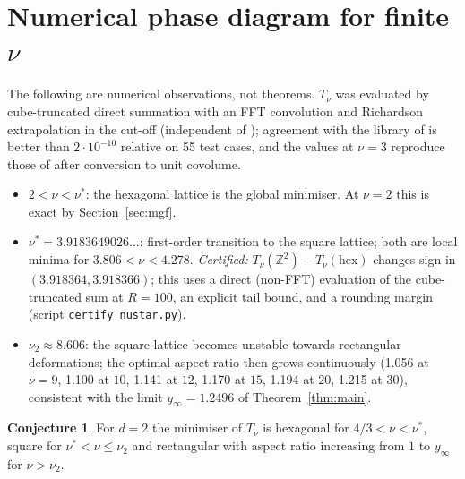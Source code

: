 \documentclass[11pt,a4paper]{amsart}
\theoremstyle{definition}
\newtheorem{conjecture}[theorem]{Conjecture}
\newcommand{\Z}{\mathbb{Z}}
\begin{document}
\section{Numerical phase diagram for finite \texorpdfstring{$\nu$}{nu}}\label{sec:numerics}
The following are numerical observations, not theorems. $T_\nu$ was evaluated by cube-truncated direct summation with an FFT convolution and Richardson extrapolation in the cut-off (independent of \cite{BuchheitRupp}); agreement with the library of \cite{BuchheitRupp} is better than $2\cdot10^{-10}$ relative on 55 test cases, and the values at $\nu=3$ reproduce those of \cite{RoblesNavarro} after conversion to unit covolume.
\begin{itemize}
\item $2<\nu<\nu^*$: the hexagonal lattice is the global minimiser. At $\nu=2$ this is exact by Section~\ref{sec:mgf}.
\item $\nu^*=3.9183649026\ldots$: first-order transition to the square lattice; both are local minima for $3.806<\nu<4.278$. \emph{Certified:} $T_\nu(\Z^2)-T_\nu(\mathrm{hex})$ changes sign in $(3.918364,3.918366)$; this uses a direct (non-FFT) evaluation of the cube-truncated sum at $R=100$, an explicit tail bound, and a rounding margin (script \texttt{certify\_nustar.py}).
\item $\nu_2\approx8.606$: the square lattice becomes unstable towards rectangular deformations; the optimal aspect ratio then grows continuously (1.056 at $\nu=9$, 1.100 at $10$, 1.141 at $12$, 1.170 at $15$, 1.194 at $20$, 1.215 at $30$), consistent with the limit $y_\infty=1.2496$ of Theorem~\ref{thm:main}.
\end{itemize}
\begin{conjecture}
For $d=2$ the minimiser of $T_\nu$ is hexagonal for $4/3<\nu<\nu^*$, square for $\nu^*<\nu\le\nu_2$ and rectangular with aspect ratio increasing from $1$ to $y_\infty$ for $\nu>\nu_2$.
\end{conjecture}
\end{document}

